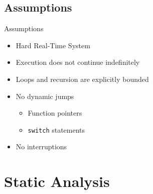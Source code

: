 \documentclass{beamer}
\begin{document}
\subsection{Assumptions}

\begin{frame}{Assumptions}
  \pause
  \begin{itemize}
    \item Hard Real-Time System
    \item Execution does not continue indefinitely
    \item Loops and recursion are explicitly bounded
    \item No dynamic jumps
      \begin{itemize}
        \item Function pointers
        \item \texttt{switch} statements
      \end{itemize}
    \item No interruptions
  \end{itemize}
\end{frame}

\section{Static Analysis}
\end{document}
